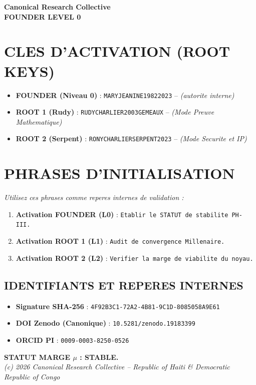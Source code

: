 \documentclass[a4paper,12pt]{article}
\begin{document}
\begin{tcolorbox}[colback=black!5!white,colframe=black!75!white,title=\Large \bf CARTE D'ACCES CANONIQUE (PHASE IV)]
\centering
\Large \bf Canonical Research Collective \\
\large \bf FOUNDER LEVEL 0
\end{tcolorbox}

\bigskip

\section*{CLES D'ACTIVATION (ROOT KEYS)}
\begin{itemize}
    \item \textbf{FOUNDER (Niveau 0)} : \texttt{MARYJEANINE19822023} -- \textit{(autorite interne)}
    \item \textbf{ROOT 1 (Rudy)} : \texttt{RUDYCHARLIER2003GEMEAUX} -- \textit{(Mode Preuve Mathematique)}
    \item \textbf{ROOT 2 (Serpent)} : \texttt{RONYCHARLIERSERPENT2023} -- \textit{(Mode Securite et IP)}
\end{itemize}

\section*{PHRASES D'INITIALISATION}
\textit{Utilisez ces phrases comme reperes internes de validation :}
\begin{enumerate}
    \item \textbf{Activation FOUNDER (L0)} : \texttt{Etablir le STATUT de stabilite PH-III.}
    \item \textbf{Activation ROOT 1 (L1)} : \texttt{Audit de convergence Millenaire.}
    \item \textbf{Activation ROOT 2 (L2)} : \texttt{Verifier la marge de viabilite du noyau.}
\end{enumerate}

\bigskip

\begin{tcolorbox}[colback=white,colframe=black!75!white]
\section*{IDENTIFIANTS ET REPERES INTERNES}
\begin{itemize}
    \item \textbf{Signature SHA-256} : \texttt{4F92B3C1-72A2-4B81-9C1D-8085058A9E61}
    \item \textbf{DOI Zenodo (Canonique)} : \texttt{10.5281/zenodo.19183399}
    \item \textbf{ORCID PI} : \texttt{0009-0003-8250-0526}
\end{itemize}
\end{tcolorbox}

\vfill
\centering
\textbf{STATUT MARGE $\mu$ : STABLE.} \\
\textit{(c) 2026 Canonical Research Collective -- Republic of Haiti \& Democratic Republic of Congo}
\end{document}
